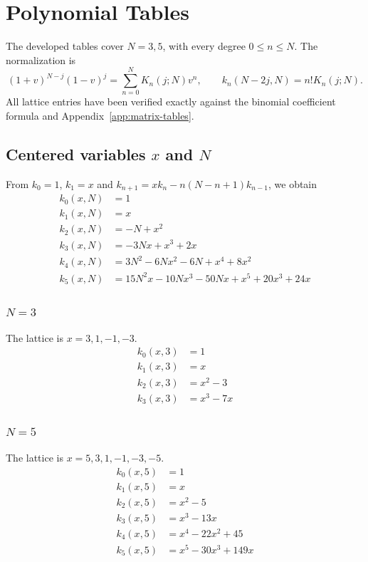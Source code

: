 \chapter{Polynomial Tables}
\label{app:polynomial-tables}
The developed tables cover $N=3,5$, with every degree $0\leq n\leq N$.
The normalization is
\[
(1+v)^{N-j}(1-v)^j=\sum_{n=0}^N K_n(j;N)v^n,
\qquad k_n(N-2j,N)=n!K_n(j;N).
\]
All lattice entries have been verified exactly against the binomial
coefficient formula and Appendix~\ref{app:matrix-tables}.

\section{Centered variables $x$ and $N$}
From $k_0=1$, $k_1=x$ and
$k_{n+1}=xk_n-n(N-n+1)k_{n-1}$, we obtain
\begin{align*}
k_{0}(x,N)&=1 \\
k_{1}(x,N)&=x \\
k_{2}(x,N)&=- N + x^{2} \\
k_{3}(x,N)&=- 3 N x + x^{3} + 2 x \\
k_{4}(x,N)&=3 N^{2} - 6 N x^{2} - 6 N + x^{4} + 8 x^{2} \\
k_{5}(x,N)&=15 N^{2} x - 10 N x^{3} - 50 N x + x^{5} + 20 x^{3} + 24 x
\end{align*}
\subsection{$N=3$}
The lattice is $x=3,1,-1,-3$.
\begin{align*}
k_{0}(x,3)&=1 \\
k_{1}(x,3)&=x \\
k_{2}(x,3)&=x^{2} - 3 \\
k_{3}(x,3)&=x^{3} - 7 x
\end{align*}
\subsection{$N=5$}
The lattice is $x=5,3,1,-1,-3,-5$.
\begin{align*}
k_{0}(x,5)&=1 \\
k_{1}(x,5)&=x \\
k_{2}(x,5)&=x^{2} - 5 \\
k_{3}(x,5)&=x^{3} - 13 x \\
k_{4}(x,5)&=x^{4} - 22 x^{2} + 45 \\
k_{5}(x,5)&=x^{5} - 30 x^{3} + 149 x
\end{align*}
